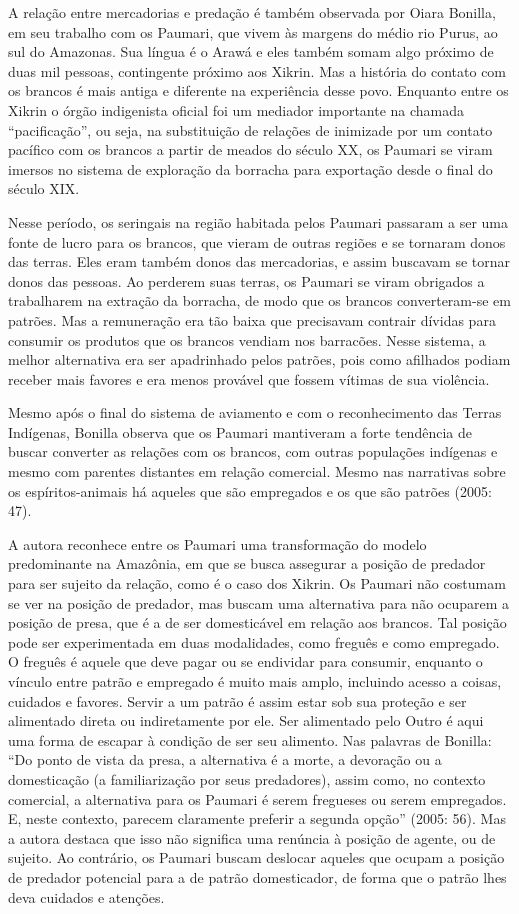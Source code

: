 A relação entre mercadorias e predação é também observada por Oiara
Bonilla, em seu trabalho com os Paumari, que vivem às margens do médio
rio Purus, ao sul do Amazonas. Sua língua é o Arawá e eles também somam
algo próximo de duas mil pessoas, contingente próximo aos Xikrin. Mas a
história do contato com os brancos é mais antiga e diferente na
experiência desse povo. Enquanto entre os Xikrin o órgão indigenista
oficial foi um mediador importante na chamada ``pacificação'', ou seja,
na substituição de relações de inimizade por um contato pacífico com os
brancos a partir de meados do século XX, os Paumari se viram imersos no
sistema de exploração da borracha para exportação desde o final do
século XIX.

Nesse período, os seringais na região habitada pelos Paumari passaram a
ser uma fonte de lucro para os brancos, que vieram de outras regiões e
se tornaram donos das terras. Eles eram também donos das mercadorias, e
assim buscavam se tornar donos das pessoas. Ao perderem suas terras, os
Paumari se viram obrigados a trabalharem na extração da borracha, de
modo que os brancos converteram-se em patrões. Mas a remuneração era tão
baixa que precisavam contrair dívidas para consumir os produtos que os
brancos vendiam nos barracões. Nesse sistema, a melhor alternativa era
ser apadrinhado pelos patrões, pois como afilhados podiam receber mais
favores e era menos provável que fossem vítimas de sua violência.

Mesmo após o final do sistema de aviamento e com o reconhecimento das
Terras Indígenas, Bonilla observa que os Paumari mantiveram a forte
tendência de buscar converter as relações com os brancos, com outras
populações indígenas e mesmo com parentes distantes em relação
comercial. Mesmo nas narrativas sobre os espíritos-animais há aqueles
que são empregados e os que são patrões (2005: 47).

A autora reconhece entre os Paumari uma transformação do modelo
predominante na Amazônia, em que se busca assegurar a posição de
predador para ser sujeito da relação, como é o caso dos Xikrin. Os
Paumari não costumam se ver na posição de predador, mas buscam uma
alternativa para não ocuparem a posição de presa, que é a de ser
domesticável em relação aos brancos. Tal posição pode ser experimentada
em duas modalidades, como freguês e como empregado. O freguês é aquele
que deve pagar ou se endividar para consumir, enquanto o vínculo entre
patrão e empregado é muito mais amplo, incluindo acesso a coisas,
cuidados e favores. Servir a um patrão é assim estar sob sua proteção e
ser alimentado direta ou indiretamente por ele. Ser alimentado pelo
Outro é aqui uma forma de escapar à condição de ser seu alimento. Nas
palavras de Bonilla: ``Do ponto de vista da presa, a alternativa é a
morte, a devoração ou a domesticação (a familiarização por seus
predadores), assim como, no contexto comercial, a alternativa para os
Paumari é serem fregueses ou serem empregados. E, neste contexto,
parecem claramente preferir a segunda opção'' (2005: 56). Mas a autora
destaca que isso não significa uma renúncia à posição de agente, ou de
sujeito. Ao contrário, os Paumari buscam deslocar aqueles que ocupam a
posição de predador potencial para a de patrão domesticador, de forma
que o patrão lhes deva cuidados e atenções.

